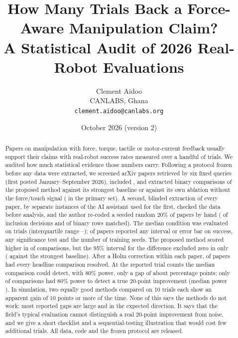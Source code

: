 \documentclass[11pt]{article}
\title{How Many Trials Back a Force-Aware Manipulation Claim?\\ A Statistical Audit of 2026 Real-Robot Evaluations}
\author{Clement Aidoo\\ CANLABS, Ghana\\ \texttt{clement.aidoo@canlabs.org}}
\date{October 2026 \quad (version 2)}
\begin{document}
\maketitle

\begin{abstract}
Papers on manipulation with force, torque, tactile or motor-current feedback usually support their claims with real-robot success rates measured over a handful of trials. We audited how much statistical evidence those numbers carry. Following a protocol frozen before any data were extracted, we screened \AuditRecords{} arXiv papers retrieved by six fixed queries (first posted January--September 2026), included \AuditIncluded{}, and extracted \AuditBinaryRows{} binary comparisons of the proposed method against its strongest baseline or against its own ablation without the force/touch signal (\AuditPrimaryRows{} in the primary set). A second, blinded extraction of every paper, by separate instances of the AI assistant used for the first, checked the data before analysis, and the author re-coded a seeded random 20\% of papers by hand (\HumIncAgree{} of \HumPapers{} inclusion decisions and \HumExactPct{} of \HumBinaryRows{} binary rows matched). The median condition was evaluated on \AuditMedianN{} trials (interquartile range \AuditNQOne--\AuditNQThree); \AuditRepCI{} of papers reported any interval or error bar on success, \AuditRepTest{} any significance test and \AuditRepSeeds{} the number of training seeds. The proposed method scored higher in \AuditSharePBetter{} of comparisons, but the 95\% interval for the difference excluded zero in only \AuditShareCIExcl{} (\AuditShareBCIExcl{} against the strongest baseline). After a Holm correction within each paper, \AuditPapersHolmAll{} of papers had every headline comparison resolved. At the reported trial counts the median comparison could detect, with 80\% power, only a gap of about \AuditMedianMDD{} percentage points; only \AuditSharePowTwenty{} of comparisons had 80\% power to detect a true 20-point improvement (median power \AuditMedPowTwenty{}). In simulation, two equally good methods compared on 10 trials each show an apparent gain of 10 points or more \AuditNullTenOneFiveOne{} of the time. None of this says the methods do not work: most reported gaps are large and in the expected direction. It says that the field's typical evaluation cannot distinguish a real 20-point improvement from noise, and we give a short checklist and a sequential-testing illustration that would cost few additional trials. All data, code and the frozen protocol are released.
\end{abstract}
\end{document}
